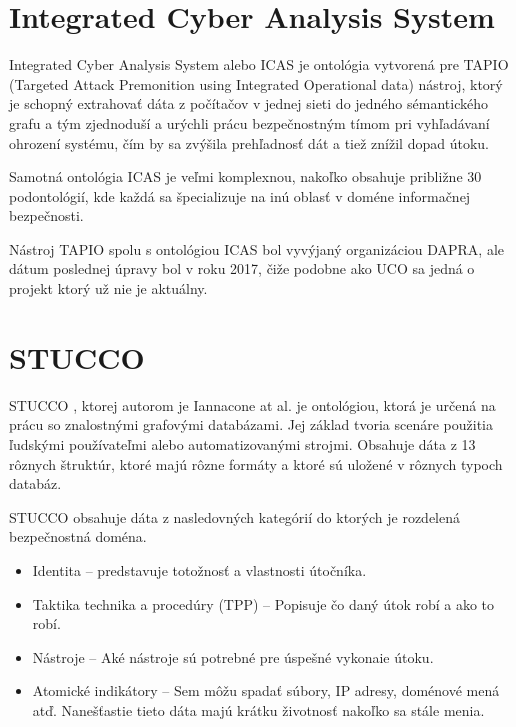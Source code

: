 \documentclass[12pt, a4paper, oneside]{book}
\begin{document}


\section{Integrated Cyber Analysis System}
Integrated Cyber Analysis System\citep{salem2015enabling} alebo ICAS je ontológia vytvorená pre TAPIO (Targeted Attack Premonition using Integrated Operational data) nástroj, ktorý je schopný extrahovať dáta z počítačov v jednej sieti do jedného sémantického grafu a tým zjednoduší a urýchli prácu bezpečnostným tímom pri vyhľadávaní ohrození systému, čím by sa zvýšila prehľadnosť dát a tiež znížil dopad útoku. 


Samotná ontológia ICAS je veľmi komplexnou, nakoľko obsahuje približne 30 podontológií, kde každá sa špecializuje na inú oblasť v doméne informačnej bezpečnosti.


Nástroj TAPIO spolu s ontológiou ICAS bol vyvýjaný organizáciou DAPRA, ale dátum poslednej úpravy bol v roku 2017, čiže podobne ako UCO sa jedná o projekt ktorý už nie je aktuálny.


\section{STUCCO}
STUCCO \citep{stucco}, ktorej autorom je Iannacone at al. je ontológiou, ktorá je určená na prácu so znalostnými grafovými databázami. Jej základ tvoria scenáre použitia ľudskými používateľmi alebo automatizovanými strojmi. Obsahuje dáta z 13 rôznych štruktúr, ktoré majú rôzne formáty a ktoré sú uložené v rôznych typoch databáz. 


STUCCO obsahuje dáta z nasledovných kategórií do ktorých je rozdelená bezpečnostná doména. 
\begin{itemize}
\item Identita -- predstavuje totožnosť a vlastnosti útočníka.
\item Taktika technika a procedúry (TPP) -- Popisuje čo daný útok robí a ako to robí.
\item Nástroje -- Aké nástroje sú potrebné pre úspešné vykonaie útoku.
\item Atomické indikátory -- Sem môžu spadať súbory, IP adresy, doménové mená atď. Nanešťastie tieto dáta majú krátku životnosť nakoľko sa stále menia.
\end{itemize}
\end{document}
